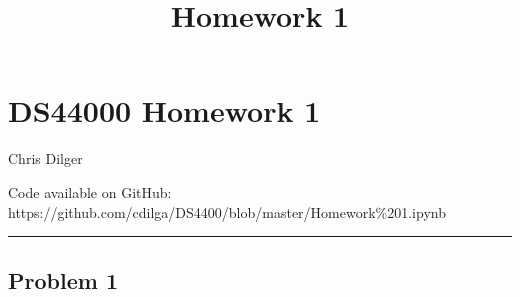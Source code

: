 \documentclass[11pt]{article}
\title{Homework 1}
\begin{document}
    
    
    \maketitle
    
    

    
    \section{DS44000 Homework 1}\label{ds44000-homework-1}

Chris Dilger

Code available on GitHub:
https://github.com/cdilga/DS4400/blob/master/Homework\%201.ipynb

\begin{center}\rule{0.5\linewidth}{\linethickness}\end{center}

\subsection{Problem 1}\label{problem-1}
\end{document}
